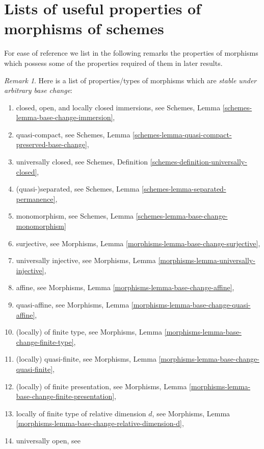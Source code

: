 \documentclass{stacks-project}
\theoremstyle{plain}
\theoremstyle{definition}
\theoremstyle{remark}
\newtheorem{remark}[subsection]{Remark}
\numberwithin{equation}{subsection}
\begin{document}
\section{Lists of useful properties of morphisms of schemes}
\label{section-lists}

\noindent
For ease of reference we list in the following remarks the
properties of morphisms which possess some of the properties
required of them in later results.

\begin{remark}
\label{remark-list-properties-stable-base-change}
Here is a list of properties/types of morphisms
which are {\it stable under arbitrary base change}:
\begin{enumerate}
\item closed, open, and locally closed immersions, see
Schemes, Lemma \ref{schemes-lemma-base-change-immersion},
\item quasi-compact, see
Schemes, Lemma \ref{schemes-lemma-quasi-compact-preserved-base-change},
\item universally closed, see
Schemes, Definition \ref{schemes-definition-universally-closed},
\item (quasi-)separated, see
Schemes, Lemma \ref{schemes-lemma-separated-permanence},
\item monomorphism, see
Schemes, Lemma \ref{schemes-lemma-base-change-monomorphism}
\item surjective, see
Morphisms, Lemma \ref{morphisms-lemma-base-change-surjective},
\item universally injective, see
Morphisms, Lemma \ref{morphisms-lemma-universally-injective},
\item affine, see
Morphisms, Lemma \ref{morphisms-lemma-base-change-affine},
\item quasi-affine, see
Morphisms, Lemma \ref{morphisms-lemma-base-change-quasi-affine},
\item (locally) of finite type, see
Morphisms, Lemma \ref{morphisms-lemma-base-change-finite-type},
\item (locally) quasi-finite, see
Morphisms, Lemma \ref{morphisms-lemma-base-change-quasi-finite},
\item (locally) of finite presentation, see
Morphisms, Lemma \ref{morphisms-lemma-base-change-finite-presentation},
\item locally of finite type of relative dimension $d$, see
Morphisms, Lemma \ref{morphisms-lemma-base-change-relative-dimension-d},
\item universally open, see

\end{enumerate}
\end{remark}
\end{document}

